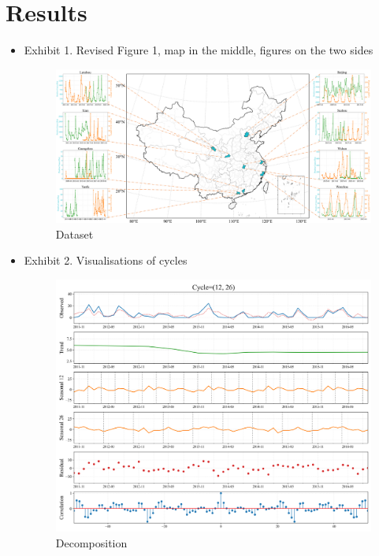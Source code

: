 \documentclass{article}
\begin{document}
\section{Results}
\begin{itemize}
    \item Exhibit 1. Revised Figure 1, map in the middle, figures on the two sides
    \begin{figure}[htbp]
      \centering
      \includegraphics[width=1.0\textwidth]{figs/Figure 1.png}
      \caption{Dataset}
      \label{fig_1}
    \end{figure}    


    
    \item Exhibit 2. Visualisations of cycles
    \begin{figure}[htbp]
      \centering
      \includegraphics[width=1.0\textwidth]{figs/decomposition_cycle_12_26.png}
      \caption{Decomposition}
      \label{fig_2}
    \end{figure}    
    

\end{itemize}
\end{document}
